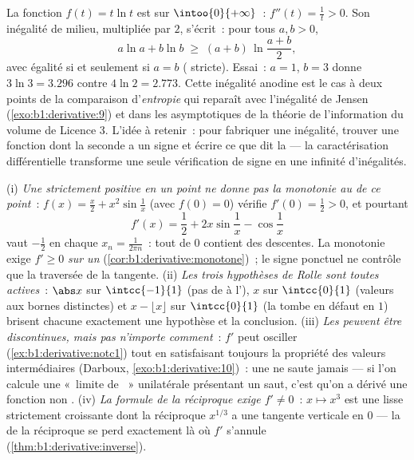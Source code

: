 \begin{example}\label{ex:b1:derivative:xlnx}
La fonction $f(t) = t\ln t$ est  sur $\intoo{0}{+\infty}$~:
$f''(t) = \frac1t > 0$. Son inégalité de milieu, multipliée par
$2$, s'écrit~: pour tous $a, b > 0$,
\[
a\ln a + b\ln b \;\geq\; (a + b)\,\ln\frac{a + b}{2} ,
\]
avec égalité si et seulement si $a = b$ ( stricte). Essai~: $a =
1$, $b = 3$ donne $3\ln 3 = 3.296$ contre $4\ln 2 = 2.773$.
Cette inégalité anodine est le cas à deux points de la comparaison
d'\emph{entropie} qui reparaît avec l'inégalité de Jensen
(\cref{exo:b1:derivative:9}) et dans les asymptotiques
de la théorie de l'information du volume de Licence 3. L'idée
à retenir~: pour fabriquer une inégalité, trouver une fonction
dont la  seconde a un signe et écrire ce que dit la 
--- la caractérisation différentielle transforme une seule vérification de
signe en une infinité d'inégalités.
\end{example}

\begin{remark}
(i) \emph{Une  strictement positive en un point ne donne pas la
monotonie au  de ce point}~: $f(x) = \frac x2 + x^2\sin\frac1x$ (avec
$f(0) = 0$) vérifie $f'(0) = \frac12 > 0$, et pourtant
\[
f'(x) = \frac12 + 2x\sin\frac1x - \cos\frac1x
\]
vaut $-\frac12$ en chaque $x_n = \frac{1}{2\pi n}$~: tout
 de $0$ contient des descentes. La monotonie exige $f'
\geq 0$ \emph{sur un }
(\cref{cor:b1:derivative:monotone})~; le signe ponctuel ne
contrôle que la traversée de la tangente. (ii) \emph{Les trois
hypothèses de Rolle sont toutes actives}~: $\abs x$ sur $\intcc{-1}{1}$
(pas de  à l'), $x$ sur $\intcc{0}{1}$ (valeurs aux
bornes distinctes) et $x - \lfloor x\rfloor$ sur $\intcc{0}{1}$ (la 
tombe en défaut en $1$) brisent chacune exactement une hypothèse et la
conclusion. (iii) \emph{Les  peuvent être discontinues, mais
pas n'importe comment}~: $f'$ peut osciller
(\cref{ex:b1:derivative:notc1}) tout en satisfaisant toujours la
propriété des valeurs intermédiaires (Darboux,
\cref{exo:b1:derivative:10})~: une  ne saute jamais --- si
l'on calcule une «~limite de ~» unilatérale présentant un saut,
c'est qu'on a dérivé une fonction non . (iv) \emph{La
formule de la réciproque exige $f' \neq 0$}~: $x \mapsto x^3$ est une
 lisse strictement croissante dont la réciproque $x^{1/3}$ a une
tangente verticale en $0$ --- la  de la réciproque se
perd exactement là où $f'$ s'annule
(\cref{thm:b1:derivative:inverse}).
\end{remark}

